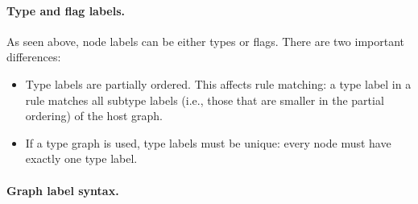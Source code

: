 %
%
%
%

\paragraph{Type and flag labels.}

As seen above, node labels can be either types or flags. There are two
important differences:
\begin{itemize}\noitemsep
\item Type labels are partially ordered. This affects rule matching: a type
  label in a rule matches all subtype labels (i.e., those that are smaller in
  the partial ordering) of the host graph.
\item If a type graph is used, type labels must be unique: every node must have
  exactly one type label.
\end{itemize}

\paragraph{Graph label syntax.}

